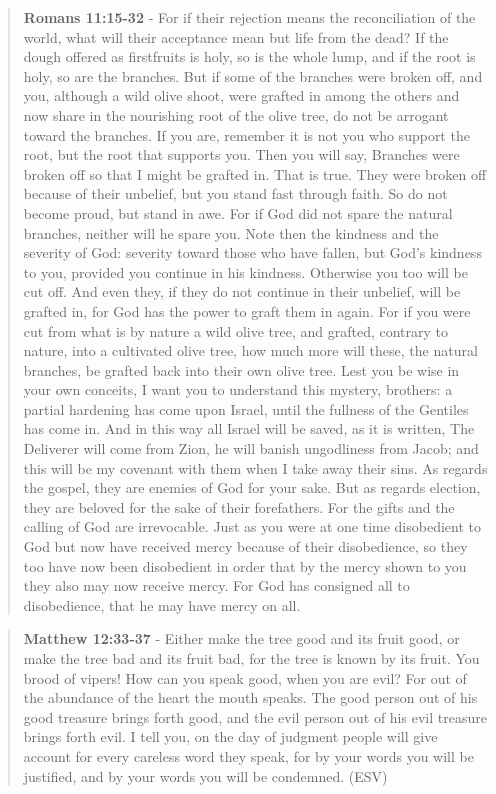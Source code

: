 \documentclass[11pt]{article}
\begin{document}
\begin{quote}
\textbf{Romans 11:15-32} - For if their rejection means the reconciliation of the world, what will their acceptance mean but life from the dead? If the dough offered as firstfruits is holy, so is the whole lump, and if the root is holy, so are the branches. But if some of the branches were broken off, and you, although a wild olive shoot, were grafted in among the others and now share in the nourishing root of the olive tree, do not be arrogant toward the branches. If you are, remember it is not you who support the root, but the root that supports you. Then you will say, Branches were broken off so that I might be grafted in. That is true. They were broken off because of their unbelief, but you stand fast through faith. So do not become proud, but stand in awe. For if God did not spare the natural branches, neither will he spare you. Note then the kindness and the severity of God: severity toward those who have fallen, but God's kindness to you, provided you continue in his kindness. Otherwise you too will be cut off. And even they, if they do not continue in their unbelief, will be grafted in, for God has the power to graft them in again. For if you were cut from what is by nature a wild olive tree, and grafted, contrary to nature, into a cultivated olive tree, how much more will these, the natural branches, be grafted back into their own olive tree. Lest you be wise in your own conceits, I want you to understand this mystery, brothers: a partial hardening has come upon Israel, until the fullness of the Gentiles has come in. And in this way all Israel will be saved, as it is written, The Deliverer will come from Zion, he will banish ungodliness from Jacob; and this will be my covenant with them when I take away their sins. As regards the gospel, they are enemies of God for your sake. But as regards election, they are beloved for the sake of their forefathers. For the gifts and the calling of God are irrevocable. Just as you were at one time disobedient to God but now have received mercy because of their disobedience, so they too have now been disobedient in order that by the mercy shown to you they also may now receive mercy. For God has consigned all to disobedience, that he may have mercy on all.
\end{quote}

\begin{quote}
\textbf{Matthew 12:33-37} - Either make the tree good and its fruit good, or make the tree bad and its fruit bad, for the tree is known by its fruit. You brood of vipers! How can you speak good, when you are evil? For out of the abundance of the heart the mouth speaks. The good person out of his good treasure brings forth good, and the evil person out of his evil treasure brings forth evil. I tell you, on the day of judgment people will give account for every careless word they speak, for by your words you will be justified, and by your words you will be condemned. (ESV)
\end{quote}
\end{document}
